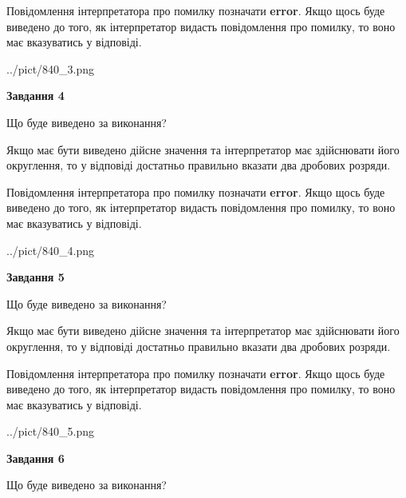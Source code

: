 \documentclass[12pt, ukrainian]{article}
\begin{document}
{\begin {Large}
Повідомлення інтерпретатора про помилку позначати \textbf{error}.
Якщо щось буде виведено до того, як інтерпретатор видасть повідомлення про помилку, 
то воно має вказуватись у відповіді. \par

\begin{center}
	{../pict/840_3.png}
\end{center}
\newpage

{\begin {center}\textbf{Завдання 4}\end {center}}\par
Що буде виведено за виконання? \par

Якщо має бути виведено дійсне значення та інтерпретатор має здійснювати його округлення, 
то у відповіді достатньо правильно вказати два дробових розряди.

Повідомлення інтерпретатора про помилку позначати \textbf{error}.
Якщо щось буде виведено до того, як інтерпретатор видасть повідомлення про помилку, 
то воно має вказуватись у відповіді. \par

\begin{center}
	{../pict/840_4.png}
\end{center}
\newpage

{\begin {center}\textbf{Завдання 5}\end {center}}\par
Що буде виведено за виконання? \par

Якщо має бути виведено дійсне значення та інтерпретатор має здійснювати його округлення, 
то у відповіді достатньо правильно вказати два дробових розряди.

Повідомлення інтерпретатора про помилку позначати \textbf{error}.
Якщо щось буде виведено до того, як інтерпретатор видасть повідомлення про помилку, 
то воно має вказуватись у відповіді. \par

\begin{center}
	{../pict/840_5.png}
\end{center}
\newpage

{\begin {center}\textbf{Завдання 6}\end {center}}\par
Що буде виведено за виконання? \par


\end{Large}}
\end{document}
